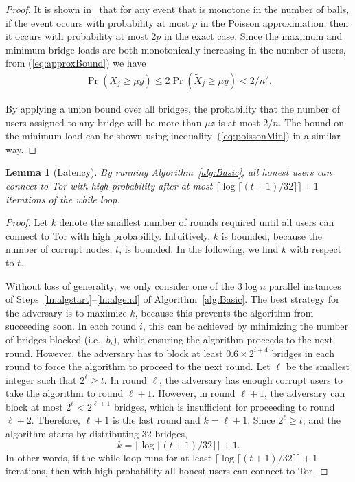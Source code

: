 \documentclass{sig-alternate-05-2015}
\newcommand{\ie}{i.e.}
\newtheorem{lemma}{Lemma}
\newcommand{\sfsize}{\fontsize{0.8\baselineskip}{0.68\baselineskip}\selectfont}
\newcommand{\sans}[1]{\textsf{\sfsize \mbox{#1}}}
\begin{document}
\begin{proof}
	It is shown in~\cite[Corollary 5.11]{Michael2005} that for any event that is monotone in the number of balls, if the event occurs with probability at most $p$ in the Poisson approximation, then it occurs with probability at most $2p$ in the exact case. Since the maximum and minimum bridge loads are both monotonically increasing in the number of users, from (\ref{eq:approxBound}) we have
	\begin{align*}
		\Pr(X_j \geq \mu y) \leq 2\Pr(\tilde{X}_j \geq \mu y) < 2/n^2.
	\end{align*}
	
	By applying a union bound over all bridges, the probability that the number of users assigned to any bridge will be more than $\mu z$ is at most $2/n$. The bound on the minimum load can be shown using inequality~(\ref{eq:poissonMin}) in a similar way.
\end{proof}

\begin{lemma}[\sans{Latency}] \label{lem:NumIterationsBasic}
	By running Algorithm~\ref{alg:Basic}, all honest users can connect to Tor with high probability after at most ${\lceil \log{\lceil (t+1)/32 \rceil} \rceil + 1}$ iterations of the while loop.
\end{lemma}
\begin{proof}
	Let $k$ denote the smallest number of rounds required until all users can connect to Tor with high probability. Intuitively, $k$ is  bounded, because the number of corrupt nodes, $t$, is bounded. In the following, we find $k$ with respect to $t$. 
	
	Without loss of generality, we only consider one of the $3\log{n}$ parallel instances of Steps~\ref{ln:algstart}--\ref{ln:algend} of Algorithm~\ref{alg:Basic}. The best strategy for the adversary is to maximize $k$, because this prevents the algorithm from succeeding soon. In each round $i$, this can be achieved by minimizing the number of bridges blocked (\ie, $b_i$), while ensuring the algorithm proceeds to the next round. However, the adversary has to block at least ${0.6 \times 2^{i+4}}$ bridges in each round to force the algorithm to proceed to the next round. Let $\ell$ be the smallest integer such that ${2^\ell \geq t}$. In round $\ell$, the adversary has enough corrupt users to take the algorithm to round ${\ell + 1}$. However, in round ${{\ell + 1}}$, the adversary can block at most ${2^\ell < 2^{\ell+1}}$ bridges, which is insufficient for proceeding to round ${\ell + 2}$. Therefore, ${\ell + 1}$ is the last round and ${k = \ell + 1}$. Since ${2^\ell \geq t}$, and the algorithm starts by distributing 32 bridges, 
	\[k = \lceil \log{\lceil (t+1)/32 \rceil} \rceil + 1.\] 
	In other words, if the while loop runs for at least ${\lceil \log{\lceil (t+1)/32 \rceil} \rceil + 1}$ iterations, then with high probability all honest users can connect to Tor.
\end{proof}
\end{document}

